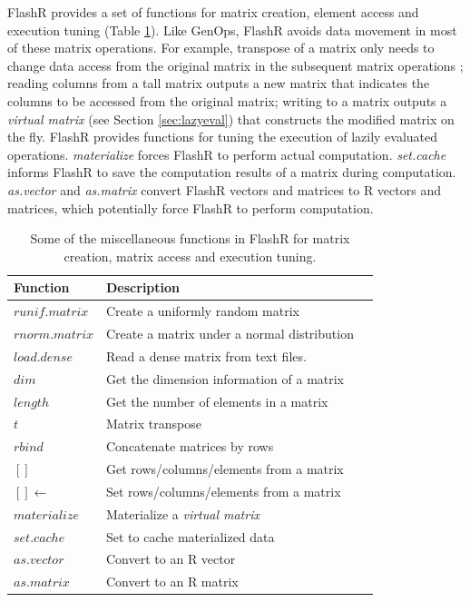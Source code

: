 FlashR provides a set of functions for matrix creation, element access
and execution tuning (Table \ref{tbl:utility}). Like GenOps, FlashR avoids
data movement in most of these matrix operations. For example, transpose
of a matrix only needs to change data access from the original matrix in
the subsequent
matrix operations \cite{Guibas78}; reading columns from a tall matrix outputs
a new matrix that indicates the columns to be accessed from the original matrix;
writing to a matrix outputs a \textit{virtual matrix} (see Section
\ref{sec:lazyeval}) that constructs the modified matrix on the fly.
FlashR provides functions for tuning the execution of lazily evaluated operations.
\textit{materialize} forces FlashR to perform actual computation.
\textit{set.cache} informs FlashR to save the computation results
of a matrix during computation. \textit{as.vector} and \textit{as.matrix}
convert FlashR vectors and matrices to R vectors and matrices, which potentially
force FlashR to perform computation.

\begin{table}
\begin{center}
\caption{Some of the miscellaneous functions in FlashR for matrix creation,
	matrix access and execution tuning.}
\vspace{-10pt}
\footnotesize
\begin{tabular}{|l|l|l|}
\hline
Function & Description \\
\hline
$runif.matrix$ & Create a uniformly random matrix  \\
$rnorm.matrix$ & Create a matrix under a normal distribution \\
\hline
$load.dense$ & Read a dense matrix from text files. \\
\hline
$dim$ & Get the dimension information of a matrix\\
$length$ & Get the number of elements in a matrix\\
\hline
$t$ & Matrix transpose \\
$rbind$ & Concatenate matrices by rows \\
$[]$ & Get rows/columns/elements from a matrix \\
$[]\gets$ & Set rows/columns/elements from a matrix \\
\hline
$materialize$ & Materialize a \textit{virtual matrix} \\
$set.cache$ & Set to cache materialized data \\
$as.vector$ & Convert to an R vector \\
$as.matrix$ & Convert to an R matrix \\
\hline
\end{tabular}
\normalsize
\label{tbl:utility}
\end{center}
\end{table}

